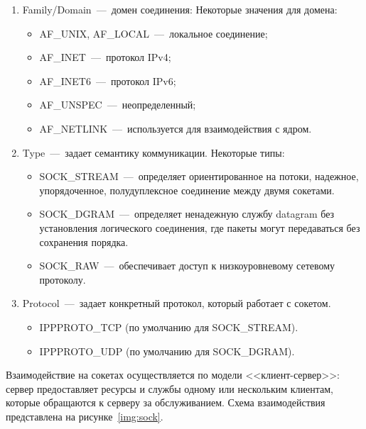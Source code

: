 \begin{enumerate}[label=\arabic*)]
	\item Family/Domain~---~домен соединения: Некоторые значения для домена:
	\begin{itemize}[label=---]
		\item AF\_UNIX, AF\_LOCAL~---~локальное соединение;
		\item AF\_INET~---~протокол IPv4;
		\item AF\_INET6~---~протокол IPv6;
		\item AF\_UNSPEC~---~неопределенный;
		\item AF\_NETLINK~---~используется для взаимодействия с ядром.
	\end{itemize}
	\item Type~---~задает семантику коммуникации. Некоторые типы: 
	\begin{itemize}[label=---]
		\item SOCK\_STREAM~---~определяет ориентированное на потоки, надежное, упорядоченное, полудуплексное соединение между двумя сокетами.
		\item SOCK\_DGRAM~---~определяет ненадежную службу datagram без установления логического соединения, где пакеты могут передаваться без сохранения порядка.
		\item SOCK\_RAW~---~обеспечивает доступ к низкоуровневому сетевому протоколу.
	\end{itemize}
	\item Protocol~---~задает конкретный протокол, который работает с сокетом.
	\begin{itemize}[label=---]
		\item IPPPROTO\_TCP (по умолчанию для SOCK\_STREAM).
		\item IPPPROTO\_UDP (по умолчанию для SOCK\_DGRAM).
	\end{itemize}
\end{enumerate}

Взаимодействие на сокетах осуществляется по модели <<клиент-сервер>>: сервер предоставляет ресурсы и службы одному или нескольким клиентам, которые обращаются к серверу за обслуживанием. Схема взаимодействия представлена на рисунке~\ref{img:sock}.


